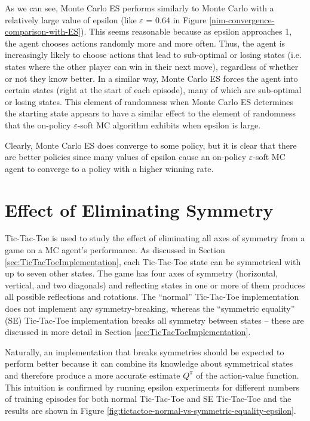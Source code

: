 \documentclass[11pt,a4paper]{report}
\begin{document}
As we can see, Monte Carlo ES performs similarly to Monte Carlo with a relatively large value of epsilon (like $\varepsilon$ = 0.64 in Figure \ref{nim-convergence-comparison-with-ES}). This seems reasonable because as epsilon approaches 1, the agent chooses actions randomly more and more often. Thus, the agent is increasingly likely to choose actions that lead to sub-optimal or losing states (i.e. states where the other player can win in their next move), regardless of whether or not they know better. In a similar way, Monte Carlo ES forces the agent into certain states (right at the start of each episode), many of which are sub-optimal or losing states. This element of randomness when Monte Carlo ES determines the starting state appears to have a similar effect to the element of randomness that the on-policy $\varepsilon$-soft MC algorithm exhibits when epsilon is large.

Clearly, Monte Carlo ES does converge to some policy, but it is clear that there are better policies since many values of epsilon cause an on-policy $\varepsilon$-soft MC agent to converge to a policy with a higher winning rate.


\section{Effect of Eliminating Symmetry}

Tic-Tac-Toe is used to study the effect of eliminating all axes of symmetry from a game on a MC agent's performance. As discussed in Section \ref{sec:TicTacToeImplementation}, each Tic-Tac-Toe state can be symmetrical with up to seven other states. The game has four axes of symmetry (horizontal, vertical, and two diagonals) and reflecting states in one or more of them produces all possible reflections and rotations. The ``normal'' Tic-Tac-Toe implementation does not implement any symmetry-breaking, whereas the ``symmetric equality'' (SE) Tic-Tac-Toe implementation breaks all symmetry between states -- these are discussed in more detail in Section \ref{sec:TicTacToeImplementation}.

Naturally, an implementation that breaks symmetries should be expected to perform better because it can combine its knowledge about symmetrical states and therefore produce a more accurate estimate $Q^{\pi}$ of the action-value function. This intuition is confirmed by running epsilon experiments for different numbers of training episodes for both normal Tic-Tac-Toe and SE Tic-Tac-Toe and the results are shown in Figure \ref{fig:tictactoe-normal-vs-symmetric-equality-epsilon}.
\end{document}
